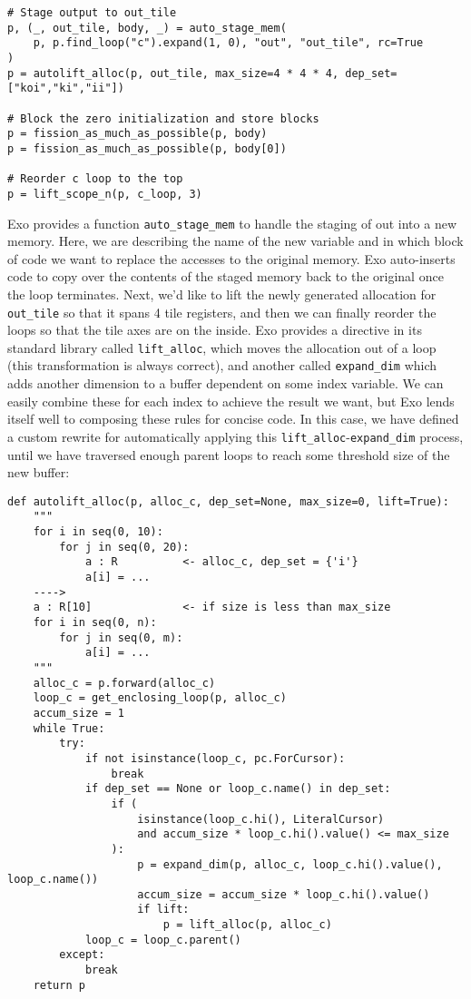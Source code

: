 \documentclass[acmsmall, nonacm=true]{acmart}
\begin{document}
\begin{verbatim}
# Stage output to out_tile
p, (_, out_tile, body, _) = auto_stage_mem(
    p, p.find_loop("c").expand(1, 0), "out", "out_tile", rc=True
)
p = autolift_alloc(p, out_tile, max_size=4 * 4 * 4, dep_set=["koi","ki","ii"])

# Block the zero initialization and store blocks
p = fission_as_much_as_possible(p, body)
p = fission_as_much_as_possible(p, body[0])

# Reorder c loop to the top
p = lift_scope_n(p, c_loop, 3)
\end{verbatim}

Exo provides a function \verb|auto_stage_mem| to handle the staging of out into a new memory. Here, we are describing the name of the new variable and in which block of code we want to replace the accesses to the original memory. Exo auto-inserts code to copy over the contents of the staged memory back to the original once the loop terminates. 
Next, we'd like to lift the newly generated allocation for \verb|out_tile| so that it spans 4 tile registers, and then we can finally reorder the loops so that the tile axes are on the inside. Exo provides a directive in its standard library called \verb|lift_alloc|, which moves the allocation out of a loop (this transformation is always correct), and another called \verb|expand_dim| which adds another dimension to a buffer dependent on some index variable. We can easily combine these for each index to achieve the result we want, but Exo lends itself well to composing these rules for concise code. In this case, we have defined a custom rewrite for automatically applying this \verb|lift_alloc|-\verb|expand_dim| process, until we have traversed enough parent loops to reach some threshold size of the new buffer:
\begin{verbatim}
def autolift_alloc(p, alloc_c, dep_set=None, max_size=0, lift=True):
    """
    for i in seq(0, 10):
        for j in seq(0, 20):
            a : R          <- alloc_c, dep_set = {'i'}
            a[i] = ...
    ---->
    a : R[10]              <- if size is less than max_size
    for i in seq(0, n):
        for j in seq(0, m):
            a[i] = ...
    """
    alloc_c = p.forward(alloc_c)
    loop_c = get_enclosing_loop(p, alloc_c)
    accum_size = 1
    while True:
        try:
            if not isinstance(loop_c, pc.ForCursor):
                break
            if dep_set == None or loop_c.name() in dep_set:
                if (
                    isinstance(loop_c.hi(), LiteralCursor)
                    and accum_size * loop_c.hi().value() <= max_size
                ):
                    p = expand_dim(p, alloc_c, loop_c.hi().value(), loop_c.name())
                    accum_size = accum_size * loop_c.hi().value()
                    if lift:
                        p = lift_alloc(p, alloc_c)
            loop_c = loop_c.parent()
        except:
            break
    return p
\end{verbatim}
\end{document}
